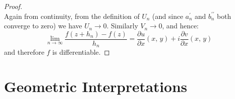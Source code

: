 \documentclass{article}
\theoremstyle{definition}
\begin{document}
\begin{proof}
\begin{equation}
            \end{equation}
            Again from continuity, from the definition of $U_{n}$
            (and since $a_{n}^{\prime}$ and $b_{n}^{\prime\prime}$ both
            converge to zero) we have $U_{n}\rightarrow{0}$. Similarly
            $V_{n}\rightarrow{0}$, and hence:
            \begin{equation}
                \lim_{n\rightarrow\infty}
                \frac{f(z+h_{n})-f(z)}{h_{n}}
                =\frac{\partial{u}}{\partial{x}}(x,\,y)
                +i\frac{\partial{v}}{\partial{x}}(x,\,y)
            \end{equation}
            and therefore $f$ is differentiable.
        \end{proof}
    \section{Geometric Interpretations}
    
    
\end{document}
